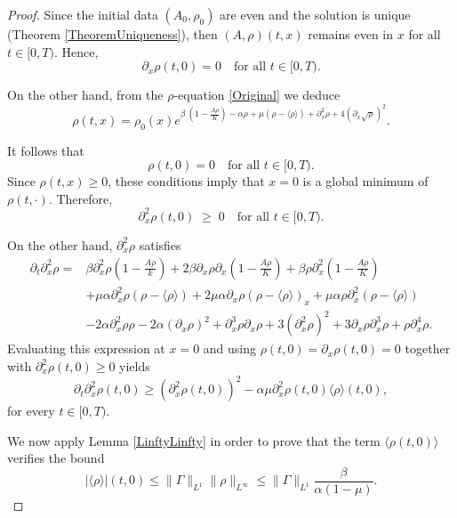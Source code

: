 \documentclass[12pt]{amsart}
\begin{document}
\begin{proof}
	Since the initial data $(A_0,\rho_0)$ are even and the solution is unique (Theorem \ref{TheoremUniqueness}),    then $(A,\rho)(t,x)$ remains even in $x$ for all $t\in[0,T)$. Hence,  
\[
\partial_x\rho(t,0)=0
\quad\text{for all }t\in[0,T).
\]
	
	On the other hand, from the $\rho$-equation \eqref{Original} we deduce
	\begin{equation*}
		\rho(t,x)=\rho_0(x)e^{\beta\ \left(1-\frac{A\rho}{K} \right)-\alpha\rho+\mu(\rho-\langle \rho\rangle)+ \partial_{x}^2\rho+4(\partial_{x}\sqrt{\rho})^2}.
	\end{equation*}

	It follows that 
\[
\rho(t,0)=0
\quad\text{for all }t\in[0,T).
\]
Since $\rho(t,x)\ge0$, these conditions imply that $x=0$ is a global minimum of $\rho(t,\cdot)$. Therefore,
\[
\partial_{x}^{2}\rho(t,0)\;\ge\;0
\quad\text{for all }t\in[0,T).
\]
	

	
	On the other hand, $\partial_{x}^2 \rho$ satisfies 
	\begin{equation*}
		\begin{split}
			\partial_t \partial_{x}^2\rho=&\beta\partial_{x}^2\rho\left(1-\frac{A\rho}{k} \right)+2\beta \partial_{x}\rho\partial_{x}\left(1-\frac{A\rho}{K} \right)+\beta \rho\partial_{x}^2\left(1-\frac{A\rho}{K} \right)\\
			&+\mu \alpha \partial_{x}^2\rho\left(\rho-\langle \rho\rangle \right) +2\mu \alpha \partial_{x}\rho\left(\rho-\langle \rho\rangle \right)_{x}+\mu \alpha \rho\partial_{x}^2\left(\rho-\langle \rho\rangle \right)\\
			&-2\alpha\partial_{x}^2\rho\rho-2\alpha(\partial_{x}\rho)^2+ \partial_x^3\rho \partial_x\rho +3 (\partial_{x}^2 \rho)^2+3 \partial_x \rho \partial_{x}^3 \rho + \rho \partial_{x}^4 \rho  .
		\end{split}
	\end{equation*}
	Evaluating this expression at $x=0$ and using $\rho(t,0)=\partial_x\rho(t,0)=0$ together with $\partial_x^2\rho(t,0)\ge0$ yields
	\begin{equation}\label{SecondDerivative0}
		\partial_t\partial_{x}^2\rho(t,0)\geq(\partial_{x}^2\rho(t,0))^2-\alpha\mu\partial_{x}^2\rho(t,0)\langle\rho\rangle(t,0),
	\end{equation}
	for every $t\in[0,T)$.
	
	We now apply Lemma \ref{LinftyLinfty} in order to prove that the term $\langle \rho(t,0) \rangle$ verifies the bound
	\begin{equation*}
		|\langle \rho \rangle|(t,0)\leq \|\Gamma\|_{L^1}\|\rho\|_{L^\infty}\leq \|\Gamma\|_{L^1}\frac{\beta}{\alpha(1-\mu)}.
	\end{equation*}
	

\end{proof}
\end{document}
